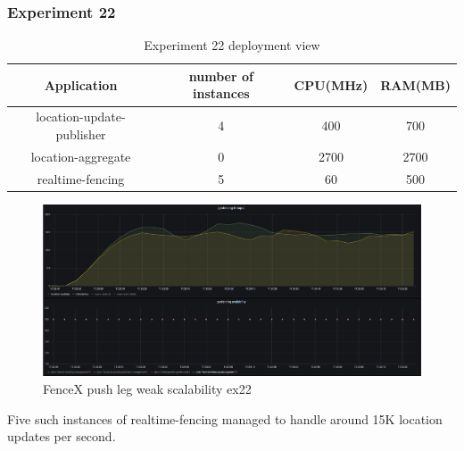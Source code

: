 \documentclass[a4]{report}
\begin{document}
    \clearpage

    \subsubsection{Experiment 22}
    \begin{table}[h!]
        \centering
        \begin{tabular}{|c|c|c|c|}
            \hline
            Application               & number of instances & CPU(MHz) & RAM(MB) \\
            \hline
            location-update-publisher & 4                   & 400      & 700     \\
            location-aggregate        & 0                   & 2700     & 2700    \\
            realtime-fencing          & 5                   & 60       & 500     \\
            \hline
        \end{tabular}
        \caption{Experiment 22 deployment view}
        \label{table:ex22-dv}
    \end{table}

    \begin{figure}[h!]
        \caption{FenceX push leg weak scalability ex22}
        \label{fig:ex22}
        \includegraphics[scale=0.4]{images/evaluation/ex22-benchmarking-ongoing-1per2sec.png}
    \end{figure}
    Five such instances of realtime-fencing managed to handle around 15K location updates per second.

    \clearpage
\end{document}
